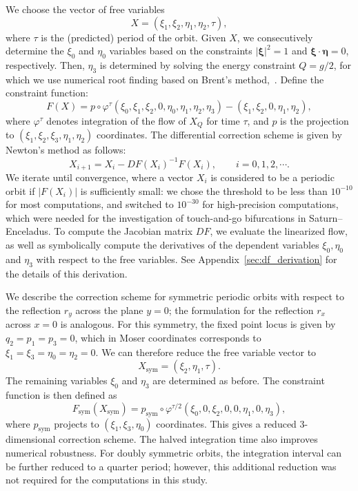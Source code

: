 \documentclass[pdflatex,sn-mathphys-ay]{sn-jnl}%
\theoremstyle{thmstyleone}%
\theoremstyle{thmstyletwo}%
\theoremstyle{thmstylethree}%
\renewcommand{\phi}{\varphi}
\begin{document}
We choose the vector of free variables 
\[
    X = (\xi_1, \xi_2, \eta_1, \eta_2, \tau),
\]
where $\tau$ is the (predicted) period of the orbit. Given $X$, we consecutively determine the $\xi_0$ and $\eta_0$ variables based on the constraints $|\boldsymbol{\xi}|^2 = 1$ and $\boldsymbol{\xi} \cdot \boldsymbol{\eta} = 0$, respectively. Then, $\eta_3$ is determined by solving the energy constraint $Q = g/2$, for which we use numerical root finding based on Brent's method,~\cite{brent_algorithm_1971}.
Define the constraint function:
\begin{equation*}
    F(X) = p \circ \phi^\tau(\xi_0, \xi_1, \xi_2, 0, \eta_0, \eta_1, \eta_2, \eta_3) - (\xi_1, \xi_2, 0, \eta_1, \eta_2),
\end{equation*}
where $\phi^\tau$ denotes integration of the flow of $X_Q$ for time $\tau$, and $p$ is the projection to $(\xi_1, \xi_2, \xi_3, \eta_1, \eta_2)$ coordinates. The differential correction scheme is given by Newton's method as follows:
\[ X_{i + 1} = X_i - DF(X_i)^{-1} F(X_i), \qquad i=0,1,2,\cdots. \]
We iterate until convergence, where a vector $X_i$ is considered to be a periodic orbit if $|F(X_i)|$ is sufficiently small: we chose the threshold to be less than $10^{-10}$ for most computations, and switched to $10^{-30}$ for high-precision computations, which were needed for the investigation of touch-and-go bifurcations in Saturn--Enceladus.
To compute the Jacobian matrix $DF$, we evaluate the linearized flow, as well as symbolically compute the derivatives of the dependent variables $\xi_0, \eta_0$ and $\eta_3$ with respect to the free variables. See Appendix~\ref{sec:df_derivation} for the details of this derivation.

We describe the correction scheme for symmetric periodic orbits with respect to the reflection $r_y$ across the plane $y=0$; the formulation for the reflection $r_x$ across $x=0$ is analogous. For this symmetry, the fixed point locus is given by $q_2 = p_1 = p_3 = 0$, which in Moser coordinates corresponds to $\xi_1 = \xi_3 = \eta_0 = \eta_2 = 0$. We can therefore reduce the free variable vector to
\[
    X_{\textrm{sym}} = (\xi_2, \eta_1, \tau).
\]
The remaining variables $\xi_0$ and $\eta_3$ are determined as before. The constraint function is then defined as
\[
    F_{\textrm{sym}}(X_{\textrm{sym}}) = p_{\textrm{sym}} \circ \phi^{\tau/2}(\xi_0, 0, \xi_2, 0, 0, \eta_1, 0, \eta_3),
\]
where $p_{\textrm{sym}}$ projects to $(\xi_1, \xi_3, \eta_0)$ coordinates. This gives a reduced $3$-dimensional correction scheme.
The halved integration time also improves numerical robustness. For doubly symmetric orbits, the integration interval can be further reduced to a quarter period; however, this additional reduction was not required for the computations in this study.
\end{document}
